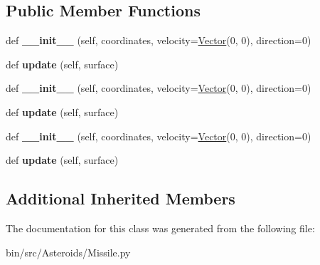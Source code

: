 \subsection*{Public Member Functions}
\begin{DoxyCompactItemize}
\item 
def {\bfseries \+\_\+\+\_\+init\+\_\+\+\_\+} (self, coordinates, velocity=\hyperlink{classVector_1_1Vector}{Vector}(0, 0), direction=0)\hypertarget{classMissile_1_1Missile_acd19b70b0fff20d2d1fb2e18c8455e93}{}\label{classMissile_1_1Missile_acd19b70b0fff20d2d1fb2e18c8455e93}

\item 
def {\bfseries update} (self, surface)\hypertarget{classMissile_1_1Missile_ab1ae0964e6012a269eedb97e906f9d58}{}\label{classMissile_1_1Missile_ab1ae0964e6012a269eedb97e906f9d58}

\item 
def {\bfseries \+\_\+\+\_\+init\+\_\+\+\_\+} (self, coordinates, velocity=\hyperlink{classVector_1_1Vector}{Vector}(0, 0), direction=0)\hypertarget{classMissile_1_1Missile_acd19b70b0fff20d2d1fb2e18c8455e93}{}\label{classMissile_1_1Missile_acd19b70b0fff20d2d1fb2e18c8455e93}

\item 
def {\bfseries update} (self, surface)\hypertarget{classMissile_1_1Missile_ab1ae0964e6012a269eedb97e906f9d58}{}\label{classMissile_1_1Missile_ab1ae0964e6012a269eedb97e906f9d58}

\item 
def {\bfseries \+\_\+\+\_\+init\+\_\+\+\_\+} (self, coordinates, velocity=\hyperlink{classVector_1_1Vector}{Vector}(0, 0), direction=0)\hypertarget{classMissile_1_1Missile_acd19b70b0fff20d2d1fb2e18c8455e93}{}\label{classMissile_1_1Missile_acd19b70b0fff20d2d1fb2e18c8455e93}

\item 
def {\bfseries update} (self, surface)\hypertarget{classMissile_1_1Missile_ab1ae0964e6012a269eedb97e906f9d58}{}\label{classMissile_1_1Missile_ab1ae0964e6012a269eedb97e906f9d58}

\end{DoxyCompactItemize}
\subsection*{Additional Inherited Members}


The documentation for this class was generated from the following file\+:\begin{DoxyCompactItemize}
\item 
bin/src/\+Asteroids/Missile.\+py\end{DoxyCompactItemize}
